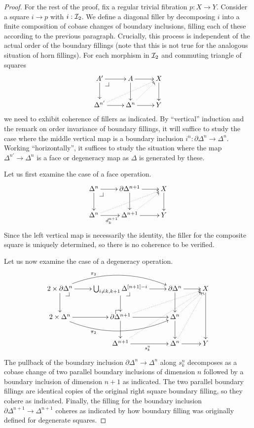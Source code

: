 \documentclass[reqno,10pt,a4paper,oneside]{amsart}
\begin{document}
\begin{proof}
For the rest of the proof, fix a regular trivial fibration $p : X \to Y$.
Consider a square $i \to p$ with $i : \cal{I}_2$.
We define a diagonal filler by decomposing $i$ into a finite composition of cobase changes of boundary inclusions, filling each of these according to the previous paragraph.
Crucially, this process is independent of the actual order of the boundary fillings (note that this is not true for the analogous situation of horn fillings).
For each morphism in $\cal{I}_2$ and commuting triangle of squares
\[
\xymatrix{
  A'
  \ar[r]
  \ar[d]
  \pullback{dr}
&
  A
  \ar[d]
  \ar[r]
&
  X
  \ar[d]
\\
  \Delta^{n'}
  \ar[r]
  \ar@{.>}[urr]
&
  \Delta^n
  \ar[r]
  \ar@{.>}[ur]
&
  Y
}
\]
we need to exhibit coherence of fillers as indicated.
By ``vertical'' induction and the remark on order invariance of boundary fillings, it will suffice to study the case where the middle vertical map is a boundary inclusion $i^n : \partial \Delta^n \to \Delta^n$.
Working ``horizontally'', it suffices to study the situation where the map $\Delta^{n'} \to \Delta^n$ is a face or degeneracy map as $\Delta$ is generated by these.

Let us first examine the case of a face operation.
\[
\xymatrix{
  \Delta^n
  \ar[r]
  \ar[d]
  \pullback{dr}
&
  \partial \Delta^{n+1}
  \ar[d]
  \ar[r]
&
  X
  \ar[d]
\\
  \Delta^n
  \ar[r]_{d_k^{n+1}}
  \ar@{.>}[urr]
&
  \Delta^{n+1}
  \ar[r]
  \ar@{.>}[ur]
&
  Y
}
\]
Since the left vertical map is necessarily the identity, the filler for the composite square is uniquely determined, so there is no coherence to be verified.

Let us now examine the case of a degeneracy operation.
\[
\xymatrix{
  2 \times \partial \Delta^n
  \ar[r]
  \ar[d]
  \ar@/^2em/[rr]^(0.3){\pi_2}
  \pullback{dr}
&
  \bigcup_{i \neq k, k+1} \Delta^{[n+1] - i}
  \ar[r]
  \ar[d]
  \pullback{dr}
&
  \partial \Delta^n
  \ar[d]
  \ar[r]
&
  X
  \ar[dd]
\\
  2 \times \Delta^n
  \ar[r]
  \ar@/_2em/[rr]_(0.3){\pi_2}
&
  \partial \Delta^{n+1}
  \ar[r]
  \ar[d]
  \ar@{.>}[urr]
  \pullback{ul}
&
  \Delta^n
  \ar[d]
  \ar@{.>}[ur]
\\&
  \Delta^{n+1}
  \ar[r]_{s_k^n}
  \ar@{.>}[uurr]
&
  \Delta^n
  \ar[r]
  \ar@{.>}[uur]
&
  Y
}
\]
The pullback of the boundary inclusion $\partial \Delta^n \to \Delta^n$ along $s_k^n$ decomposes as a cobase change of two parallel boundary inclusions of dimension $n$ followed by a boundary inclusion of dimension $n+1$ as indicated.
The two parallel boundary fillings are identical copies of the original right square boundary filling, so they cohere as indicated.
Finally, the filling for the boundary inclusion $\partial \Delta^{n+1} \to \Delta^{n+1}$ coheres as indicated by how boundary filling was originally defined for degenerate squares.
\end{proof}
\end{document}
